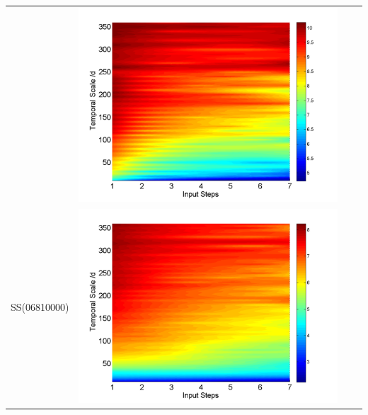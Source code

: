 \documentclass[draft,wrr]{AGUTeX}
\begin{document}
\begin{article}
\begin{table}[H]
\begin{tabular}{cccc}
&\begin{minipage}{.3\textwidth}\includegraphics[width=\linewidth]{resultgraph/11532500pepq_abs.png}\end{minipage}
\\
SS(06810000)
&\begin{minipage}{.3\textwidth}\includegraphics[width=\linewidth]{resultgraph/06810000p_abs.png}\end{minipage}

\end{tabular}
\end{table}
\end{article}
\end{document}
